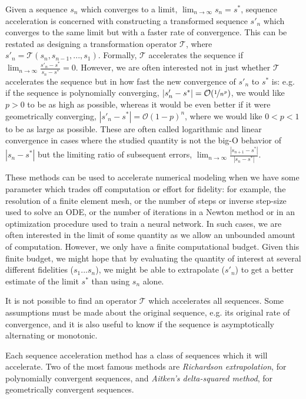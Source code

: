 \documentclass{puthesis}
\begin{document}
Given a sequence $s_n$ which converges to a limit, $\lim_{n \to \infty} s_n = s^*$,
sequence acceleration is concerned with constructing a transformed sequence $s'_n$
which converges to the same limit but with a faster rate of convergence.
This can be restated as designing a transformation operator $\mathcal{T}$, where
$s'_n = \mathcal{T}(s_n, s_{n-1}, ..., s_1)$.
Formally, $\mathcal{T}$ accelerates the sequence if
$\lim_{n \to \infty} \frac{s'_n - s^*}{s_n - s^*} = 0$.
However, we are often interested not in just whether $\mathcal{T}$ accelerates the
sequence but in how fast the new convergence of $s'_n$ to $s^*$ is: e.g.
if the sequence is polynomially converging, $|s'_n - s^*| = \mathcal{O}(\nicefrac{1}{n^p})$,
we would like $p > 0$ to be as high as possible,
whereas it would be even better if it were geometrically converging,
$|s'_n - s^*| = \mathcal{O}(1-p)^n$, where we would like
$ 0 < p < 1$ to be as large as possible.
These are often called logarithmic and linear convergence in cases
where the studied quantity is not the big-O behavior of $|s_n - s^*|$ but the limiting
ratio of subsequent errors,
$\lim_{n \to \infty} \frac{|s_{n+1} - s^*|}{|s_n - s^*|}$.

These methods can be used to accelerate numerical modeling when we have some
parameter which trades off computation or effort for fidelity: for example, the
resolution of a finite element mesh, or the number of steps or inverse step-size used to solve an ODE,
or the number of iterations in a Newton method or in an optimization procedure
used to train a neural network.
In such cases, we are often interested in
the limit of some quantity as we allow an unbounded amount of computation.
However, we only have a finite computational budget.
Given this finite budget, we might hope that by evaluating the quantity of interest
at several different fidelities ($s_1 ... s_n$), we might be able to extrapolate
($s'_n$) to get a better estimate of the limit $s^*$ than using $s_n$ alone.

It is not possible to find an operator $\mathcal{T}$ which accelerates all sequences.
Some assumptions must be made about the original sequence, e.g. its original rate of
convergence, and it is also useful to know if the sequence is asymptotically alternating
or monotonic.

Each sequence acceleration method has a class of sequences which it will accelerate.
Two of the most famous methods are \emph{Richardson extrapolation}, for polynomially
convergent sequences, and \emph{Aitken's delta-squared method}, for geometrically
convergent sequences.
\end{document}
